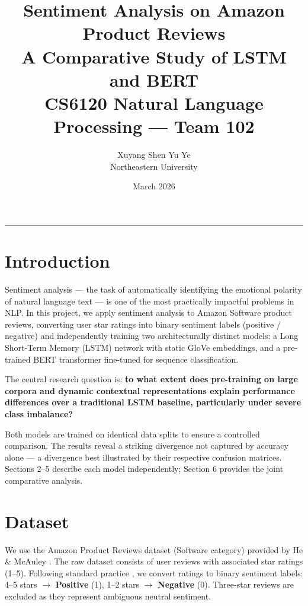\documentclass[11pt, a4paper]{article}
\title{%
  \textbf{Sentiment Analysis on Amazon Product Reviews}\\[0.4em]
  \large A Comparative Study of LSTM and BERT\\[0.2em]
  \normalsize CS6120 Natural Language Processing --- Team 102
}
\author{Xuyang Shen \quad Yu Ye\\
  \small Northeastern University}
\date{March 2026}
\begin{document}
\maketitle
\tableofcontents
\vspace{0.5em}\hrule\vspace{1em}

\section{Introduction}

Sentiment analysis --- the task of automatically identifying the emotional polarity of natural language text --- is one of the most practically impactful problems in NLP. In this project, we apply sentiment analysis to Amazon Software product reviews, converting user star ratings into binary sentiment labels (positive / negative) and independently training two architecturally distinct models: a Long Short-Term Memory (LSTM) network with static GloVe embeddings, and a pre-trained BERT transformer fine-tuned for sequence classification.

The central research question is: \textbf{to what extent does pre-training on large corpora and dynamic contextual representations explain performance differences over a traditional LSTM baseline, particularly under severe class imbalance?}

Both models are trained on identical data splits to ensure a controlled comparison. The results reveal a striking divergence not captured by accuracy alone --- a divergence best illustrated by their respective confusion matrices. Sections 2--5 describe each model independently; Section 6 provides the joint comparative analysis.

\section{Dataset}

We use the Amazon Product Reviews dataset (Software category) provided by He \& McAuley \cite{mcauley2016ups}. The raw dataset consists of user reviews with associated star ratings (1--5). Following standard practice \cite{zhang2018deep}, we convert ratings to binary sentiment labels: 4--5 stars $\rightarrow$ \textbf{Positive} (1), 1--2 stars $\rightarrow$ \textbf{Negative} (0). Three-star reviews are excluded as they represent ambiguous neutral sentiment.
\end{document}
